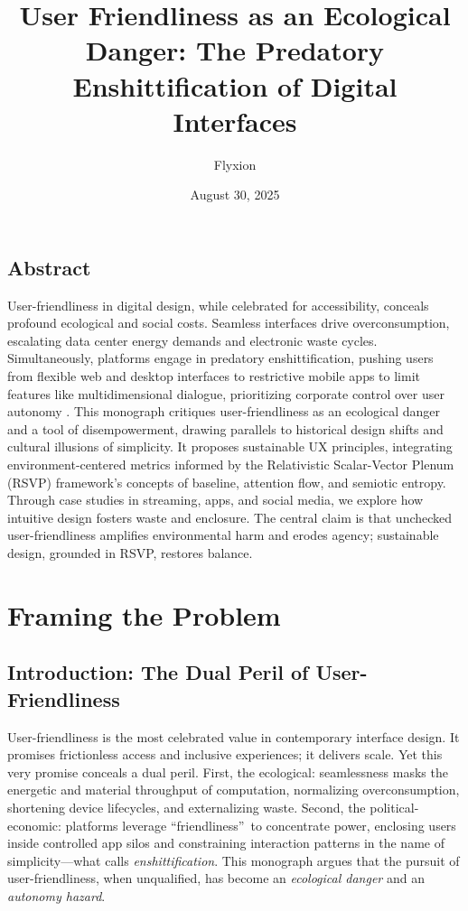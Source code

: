 \documentclass[openany]{book}
\title{User Friendliness as an Ecological Danger: The Predatory Enshittification of Digital Interfaces}
\author{Flyxion}
\date{August 30, 2025}
\begin{document}
\maketitle
{}

\chapter*{Abstract}
User-friendliness in digital design, while celebrated for accessibility, conceals profound ecological and social costs. Seamless interfaces drive overconsumption, escalating data center energy demands and electronic waste cycles. Simultaneously, platforms engage in predatory enshittification, pushing users from flexible web and desktop interfaces to restrictive mobile apps to limit features like multidimensional dialogue, prioritizing corporate control over user autonomy \citep{doctorow2022}. This monograph critiques user-friendliness as an ecological danger and a tool of disempowerment, drawing parallels to historical design shifts and cultural illusions of simplicity. It proposes sustainable UX principles, integrating environment-centered metrics informed by the Relativistic Scalar-Vector Plenum (RSVP) framework's concepts of baseline, attention flow, and semiotic entropy. Through case studies in streaming, apps, and social media, we explore how intuitive design fosters waste and enclosure. The central claim is that unchecked user-friendliness amplifies environmental harm and erodes agency; sustainable design, grounded in RSVP, restores balance.

\clearpage
{}
\tableofcontents
\clearpage
{}

\part{Framing the Problem}

\chapter{Introduction: The Dual Peril of User-Friendliness}
\label{ch:intro}

User-friendliness is the most celebrated value in contemporary interface design. It promises frictionless access and inclusive experiences; it delivers scale. Yet this very promise conceals a dual peril. First, the ecological: seamlessness masks the energetic and material throughput of computation, normalizing overconsumption, shortening device lifecycles, and externalizing waste. Second, the political-economic: platforms leverage \textquotedblleft friendliness\textquotedblright\ to concentrate power, enclosing users inside controlled app silos and constraining interaction patterns in the name of simplicity---what \citet{doctorow2022} calls \emph{enshittification}. This monograph argues that the pursuit of user-friendliness, when unqualified, has become an \emph{ecological danger} and an \emph{autonomy hazard}.
\end{document}
